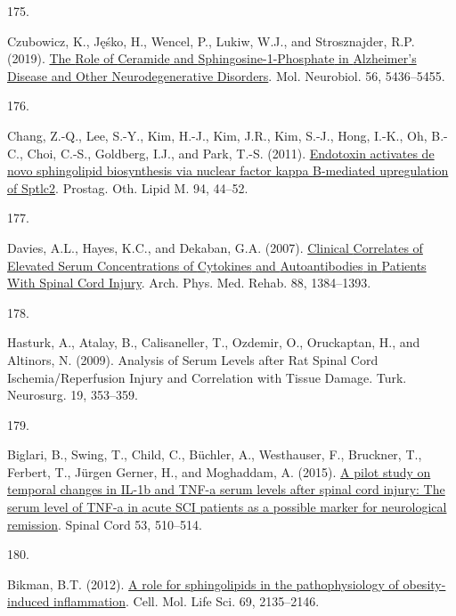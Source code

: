 \documentclass[
]{article}
\newlength{\cslhangindent}
\newlength{\csllabelwidth}
\newlength{\cslentryspacingunit} %
\newenvironment{CSLReferences}[2] %
 {%
  \setlength{\parindent}{0pt}
  \ifodd #1
  \let\oldpar\par
  \def\par{\hangindent=\cslhangindent\oldpar}
  \fi
  \setlength{\parskip}{#2\cslentryspacingunit}
 }%
 {}
\newcommand{\CSLLeftMargin}[1]{\parbox[t]{\csllabelwidth}{#1}}
\newcommand{\CSLRightInline}[1]{\parbox[t]{\linewidth - \csllabelwidth}{#1}\break}
\begin{document}
\begin{CSLReferences}{0}{0}
\leavevmode{}%
\CSLLeftMargin{175. }
\CSLRightInline{Czubowicz, K., Jęśko, H., Wencel, P., Lukiw, W.J., and Strosznajder, R.P. (2019). \href{https://doi.org/10.1007/s12035-018-1448-3}{The {Role} of {Ceramide} and {Sphingosine-1-Phosphate} in {Alzheimer}'s {Disease} and {Other Neurodegenerative Disorders}}. Mol. Neurobiol. 56, 5436--5455.}

\leavevmode{}%
\CSLLeftMargin{176. }
\CSLRightInline{Chang, Z.-Q., Lee, S.-Y., Kim, H.-J., Kim, J.R., Kim, S.-J., Hong, I.-K., Oh, B.-C., Choi, C.-S., Goldberg, I.J., and Park, T.-S. (2011). \href{https://doi.org/10.1016/j.prostaglandins.2010.12.003}{Endotoxin activates de novo sphingolipid biosynthesis via nuclear factor kappa {B-mediated} upregulation of {Sptlc2}}. Prostag. Oth. Lipid M. 94, 44--52.}

\leavevmode{}%
\CSLLeftMargin{177. }
\CSLRightInline{Davies, A.L., Hayes, K.C., and Dekaban, G.A. (2007). \href{https://doi.org/10.1016/j.apmr.2007.08.004}{Clinical {Correlates} of {Elevated Serum Concentrations} of {Cytokines} and {Autoantibodies} in {Patients With Spinal Cord Injury}}. Arch. Phys. Med. Rehab. 88, 1384--1393.}

\leavevmode{}%
\CSLLeftMargin{178. }
\CSLRightInline{Hasturk, A., Atalay, B., Calisaneller, T., Ozdemir, O., Oruckaptan, H., and Altinors, N. (2009). Analysis of {Serum Levels} after {Rat Spinal Cord Ischemia}/{Reperfusion Injury} and {Correlation} with {Tissue Damage}. Turk. Neurosurg. 19, 353--359.}

\leavevmode{}%
\CSLLeftMargin{179. }
\CSLRightInline{Biglari, B., Swing, T., Child, C., Büchler, A., Westhauser, F., Bruckner, T., Ferbert, T., Jürgen Gerner, H., and Moghaddam, A. (2015). \href{https://doi.org/10.1038/sc.2015.28}{A pilot study on temporal changes in {IL-1b} and {TNF-a} serum levels after spinal cord injury: The serum level of {TNF-a} in acute {SCI} patients as a possible marker for neurological remission}. Spinal Cord 53, 510--514.}

\leavevmode{}%
\CSLLeftMargin{180. }
\CSLRightInline{Bikman, B.T. (2012). \href{https://doi.org/10.1007/s00018-012-0917-5}{A role for sphingolipids in the pathophysiology of obesity-induced inflammation}. Cell. Mol. Life Sci. 69, 2135--2146.}


\end{CSLReferences}
\end{document}
